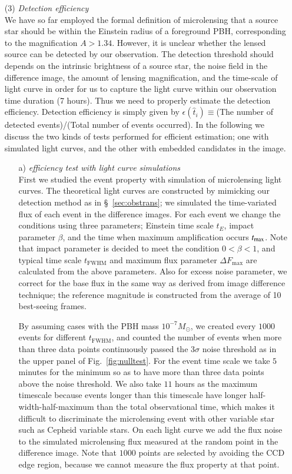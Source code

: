 \documentclass[iop, apj]{emulateapj}
\newcommand{\?}{\stackrel{?}{=}}
\begin{document}
\begin{itemize}
\item[(3)]{\it Detection efficiency}\\
We have so far employed the formal definition of microlensing that a source star should be within the Einstein radius of a foreground PBH, corresponding to the magnification $A>1.34$. However, it is unclear whether the lensed source can be detected by our observation. The detection threshold should depends on the intrinsic brightness of a source star, the noise field in the difference image, the amount of lensing magnification, and the time-scale of light curve in order for us to capture the light curve within our observation time duration (7 hours).  
Thus we need to properly estimate the detection efficiency. 
Detection efficiency is simply given by $\epsilon(\hat t_i)\equiv$(The number of detected events)/(Total number of events occurred). 
In the following we discuss the two kinds of tests performed for efficient estimation; 
one with simulated light curves, and the other with embedded candidates in the image. 
\begin{itemize}
	\item[a)]{\it efficiency test with light curve simulations}\\
	First we studied the event property with simulation of microlensing light curves. 
	The theoretical light curves are constructed by mimicking our detection method as in \S~\ref{sec:obstrans}; 
	we simulated the time-variated flux of each event in the difference images. 
	For each event we change the conditions using three parameters; 
	Einstein time scale $t_{E}$, impact parameter $\beta$, and 
	the time when maximum amplification occurs $t_{\rm max}$. 
	Note that impact parameter is decided to meet the condition $0<\beta<1$, and 
	typical time scale $t_\mathrm{FWHM}$ and maximum flux parameter $\Delta F_\mathrm{max}$ are  
	calculated from the above parameters. 
	Also for excess noise parameter, we correct for the base flux 
	in the same way as derived from image difference technique; 
	the reference magnitude is constructed from the average of 10 best-seeing frames.
	
	By assuming cases with the PBH mass $10^{-7}M_\odot$, 
	we created every $1000$ events for different $t_\mathrm{FWHM}$, and counted the number of events 
	when more than three data points continuously passed the $3\sigma$ noise threshold as in the upper panel of Fig.~\ref{fig:nulltest}. 
	For the event time scale we take $5$ minutes for the minimum so as to have more than three data points 
	above the noise threshold.  
	We also take $11$ hours as the maximum timescale because events longer than this timescale have 
	longer half-width-half-maximum than the total observational time, which makes it difficult to discriminate the 
	microlensing event with other variable star such as Cepheid variable stars. 
	On each light curve we add the flux noise to the simulated microlensing flux 
	measured at the random point in the difference image. 
	Note that $1000$ points are selected by avoiding the CCD edge region, 
        because we cannot measure the flux property at that point. 


\end{itemize}
\end{itemize}
\end{document}
